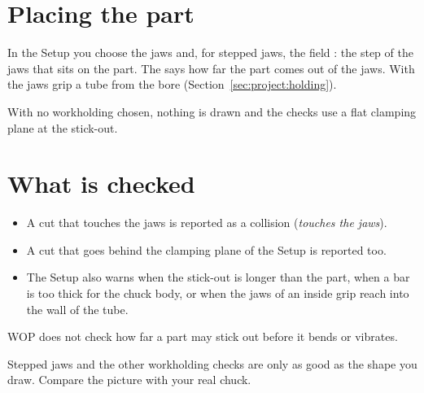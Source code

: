 \section{Placing the part}
In the Setup you choose the jaws and, for stepped jaws, the field : the step of the jaws that sits on the part. The  says how far the part comes out of the jaws. With  the jaws grip a tube from the bore (Section~\ref{sec:project:holding}).

With no workholding chosen, nothing is drawn and the checks use a flat clamping plane at the stick-out.

\section{What is checked}
\begin{itemize}
  \item A cut that touches the jaws is reported as a collision (\emph{touches the jaws}).
  \item A cut that goes behind the clamping plane of the Setup is reported too.
  \item The Setup also warns when the stick-out is longer than the part, when a bar is too thick for the chuck body, or when the jaws of an inside grip reach into the wall of the tube.
\end{itemize}
WOP does not check how far a part may stick out before it bends or vibrates.

\begin{notebox}
Stepped jaws and the other workholding checks are only as good as the shape you draw. Compare the picture with your real chuck.
\end{notebox}
